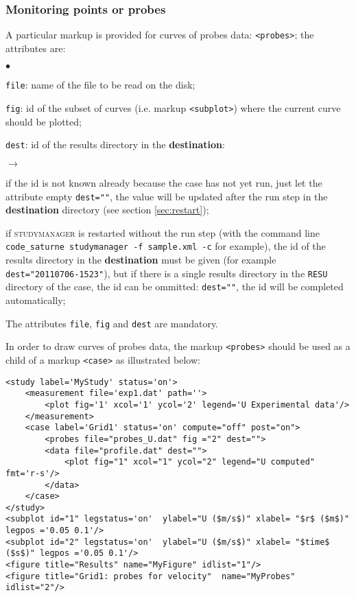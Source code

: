 \documentclass[a4paper,10pt,twoside]{csshortdoc}
\begin{document}
\subsubsection{Monitoring points or probes}

A particular markup is provided for curves of probes data:
\texttt{<probes>}; the attributes are:

\begin{list}{$\bullet$}{}
\item \texttt{file}: name of the file to be read on the disk;
\item \texttt{fig}: id of the subset of curves (i.e. markup \texttt{<subplot>})
where the current curve should be plotted;
\item \texttt{dest}: id of the results directory in the \textbf{destination}:
\begin{list}{$\rightarrow$}{}
\item if the id is not known already because the case has not yet run, just let
the attribute empty \texttt{dest=""}, the value will be updated after the run
step in the \textbf{destination} directory (see section \ref{sec:restart});
\item if \textsc{studymanager} is restarted without the run step (with the command
line \texttt{code\_saturne studymanager -f sample.xml -c} for example), the id of
the results directory in the \textbf{destination} must be given (for example
\texttt{dest="20110706-1523"}), but if there is a single results directory in
the \texttt{RESU} directory of the case, the id can be ommitted:
\texttt{dest=""}, the id will be completed automatically;
\end{list}
\end{list}

The attributes \texttt{file}, \texttt{fig} and \texttt{dest} are mandatory.

In order to draw curves of probes data, the markup \texttt{<probes>}
should be used as a child of a markup \texttt{<case>} as illustrated below:

\small
\begin{verbatim}
<study label='MyStudy' status='on'>
    <measurement file='exp1.dat' path=''>
        <plot fig='1' xcol='1' ycol='2' legend='U Experimental data'/>
    </measurement>
    <case label='Grid1' status='on' compute="off" post="on">
        <probes file="probes_U.dat" fig ="2" dest="">
        <data file="profile.dat" dest="">
            <plot fig="1" xcol="1" ycol="2" legend="U computed" fmt='r-s'/>
        </data>
    </case>
</study>
<subplot id="1" legstatus='on'  ylabel="U ($m/s$)" xlabel= "$r$ ($m$)" legpos ='0.05 0.1'/>
<subplot id="2" legstatus='on'  ylabel="U ($m/s$)" xlabel= "$time$ ($s$)" legpos ='0.05 0.1'/>
<figure title="Results" name="MyFigure" idlist="1"/>
<figure title="Grid1: probes for velocity"  name="MyProbes" idlist="2"/>
\end{verbatim}
\normalsize
\end{document}
